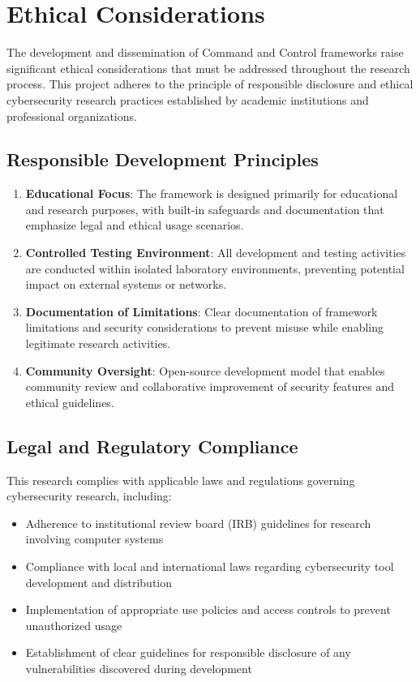 \section{Ethical Considerations}
\label{sec:ethics}

The development and dissemination of Command and Control frameworks raise significant ethical considerations that must be addressed throughout the research process. This project adheres to the principle of responsible disclosure and ethical cybersecurity research practices established by academic institutions and professional organizations.

\subsection{Responsible Development Principles}

\begin{enumerate}
\item \textbf{Educational Focus}: The framework is designed primarily for educational and research purposes, with built-in safeguards and documentation that emphasize legal and ethical usage scenarios.

\item \textbf{Controlled Testing Environment}: All development and testing activities are conducted within isolated laboratory environments, preventing potential impact on external systems or networks.

\item \textbf{Documentation of Limitations}: Clear documentation of framework limitations and security considerations to prevent misuse while enabling legitimate research activities.

\item \textbf{Community Oversight}: Open-source development model that enables community review and collaborative improvement of security features and ethical guidelines.
\end{enumerate}

\subsection{Legal and Regulatory Compliance}

This research complies with applicable laws and regulations governing cybersecurity research, including:

\begin{itemize}
\item Adherence to institutional review board (IRB) guidelines for research involving computer systems
\item Compliance with local and international laws regarding cybersecurity tool development and distribution
\item Implementation of appropriate use policies and access controls to prevent unauthorized usage
\item Establishment of clear guidelines for responsible disclosure of any vulnerabilities discovered during development
\end{itemize}

